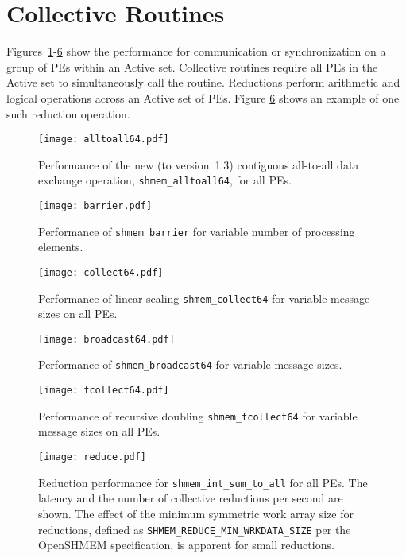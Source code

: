 \documentclass{article}
\begin{document}
\section{Collective Routines} \label{sec:collective}

Figures~\ref{fig:alltoall64}-\ref{fig:reduce} show the performance for
communication or synchronization on a group of PEs within an Active set.
Collective routines require all PEs in the Active set to simultaneously call
the routine. Reductions perform arithmetic and logical operations across an
Active set of PEs. Figure \ref{fig:reduce} shows an example of one such
reduction operation.

\begin{figure}
	\centering
	\texttt{[image: alltoall64.pdf]}
	\caption{Performance of the new (to version~1.3) contiguous all-to-all data
exchange operation, \texttt{shmem\_alltoall64}, for all PEs.}
	\label{fig:alltoall64}
\end{figure}

\begin{figure}
	\centering
	\texttt{[image: barrier.pdf]}
	\caption{Performance of \texttt{shmem\_barrier} for variable number of
processing elements.}
	\label{fig:barrier}
\end{figure}

\begin{figure}
	\centering
	\texttt{[image: collect64.pdf]}
	\caption{Performance of linear scaling \texttt{shmem\_collect64} for
variable message sizes on all PEs.}
	\label{fig:collect64}
\end{figure}

\begin{figure}
	\centering
	\texttt{[image: broadcast64.pdf]}
	\caption{Performance of \texttt{shmem\_broadcast64} for variable message
sizes.}
	\label{fig:broadcast64}
\end{figure}

\begin{figure}
	\centering
	\texttt{[image: fcollect64.pdf]}
	\caption{Performance of recursive doubling \texttt{shmem\_fcollect64} for
variable message sizes on all PEs.}
	\label{fig:fcollect64}
\end{figure}

\begin{figure}
	\centering
	\texttt{[image: reduce.pdf]}
	\caption{Reduction performance for \texttt{shmem\_int\_sum\_to\_all} for all
PEs. The latency and the number of collective reductions per second are shown.
The effect of the minimum symmetric work array size for reductions, defined as
\texttt{SHMEM\_REDUCE\_MIN\_WRKDATA\_SIZE} per the \mbox{OpenSHMEM}
specification, is apparent for small reductions.}
	\label{fig:reduce}
\end{figure}
\end{document}
